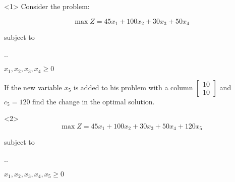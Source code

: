   \begin{frameExample}{\label{example:6.6-3.2}}{}
    \begin{onlyenv}<1>
      Consider the problem: 

    \[ \max Z = 45x_1 +100x_2 +30x_3 + 50x_4 \]

    subject to
    
    {\centering
  \sysdelim..%

  \vspace{5mm}
  $x_1, x_2, x_3,x_4 \geq 0$    
  \par}

If the new variable $x_5$ is added to his problem with a column $
\begin{bmatrix}
  10\\10
\end{bmatrix}
$ %
and $c_5 = 120$ find the change in the optimal solution.
\end{onlyenv}
\begin{onlyenv}<2>
   \[ \max Z = 45x_1 +100x_2 +30x_3 + 50x_4 + 120x_5\]

    subject to
    
    {\centering
  \sysdelim..%

  \vspace{5mm}
  $x_1, x_2, x_3,x_4, x_5\geq 0$    
  \par}
\end{onlyenv}
  \end{frameExample}


